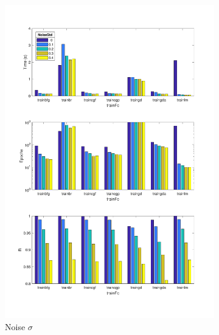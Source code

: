 \begin{landscape}
\begin{figure}[p]
\begin{subfigure}{0.37\linewidth}
            \includegraphics[width=\linewidth]{img/NoiseStd.pdf}
            \caption{Noise $\sigma$}
        \end{subfigure}
        \begin{subfigure}{0.37\linewidth}

\end{subfigure}
\end{figure}
\end{landscape}
